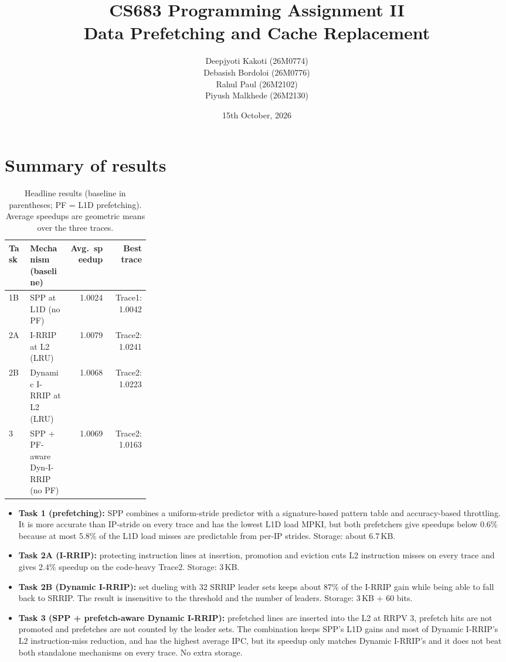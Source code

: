 \documentclass[11pt]{article}
\title{CS683 Programming Assignment II\\Data Prefetching and Cache Replacement}
\date{15th October, 2026}
\author{
      Deepjyoti Kakoti (26M0774)  \\
      Debasish Bordoloi (26M0776) \\
      Rahul Paul (26M2102) \\
      Piyush Malkhede (26M2130)
}
\begin{document}
\sloppy
\maketitle

\section*{Summary of results}
\begin{table}[H]
\centering
\small
\setlength{\tabcolsep}{4pt}
\begin{tabular}{lp{0.28\linewidth}rr}
\toprule
Task & Mechanism (baseline) & Avg.\ speedup & Best trace\\
\midrule
1B & SPP at L1D (no PF) & 1.0024 & Trace1: 1.0042 \\
2A & I-RRIP at L2 (LRU) & 1.0079 & Trace2: 1.0241 \\
2B & Dynamic I-RRIP at L2 (LRU) & 1.0068 & Trace2: 1.0223 \\
3 & SPP + PF-aware Dyn-I-RRIP (no PF) & 1.0069 & Trace2: 1.0163 \\
\bottomrule
\end{tabular}
\caption{Headline results (baseline in parentheses; PF = L1D prefetching).
Average speedups are geometric means over the three traces.}
\label{tab:summary}
\end{table}

\begin{itemize}
  \item \textbf{Task 1 (prefetching):} SPP combines a uniform-stride predictor
        with a signature-based pattern table and accuracy-based throttling. It
        is more accurate than IP-stride on every trace and has the lowest L1D
        load MPKI, but both prefetchers give speedups below 0.6\% because at
        most 5.8\% of the L1D load misses are predictable from per-IP strides.
        Storage: about 6.7\,KB.
  \item \textbf{Task 2A (I-RRIP):} protecting instruction lines at insertion,
        promotion and eviction cuts L2 instruction misses on every trace and
        gives 2.4\% speedup on the code-heavy Trace2. Storage: 3\,KB.
  \item \textbf{Task 2B (Dynamic I-RRIP):} set dueling with 32 SRRIP leader sets
        keeps about 87\% of the I-RRIP gain while being able to fall back to
        SRRIP. The result is insensitive to the threshold and the number of
        leaders. Storage: 3\,KB + 60 bits.
  \item \textbf{Task 3 (SPP + prefetch-aware Dynamic I-RRIP):} prefetched
        lines are inserted into the L2 at RRPV 3, prefetch hits are not
        promoted and prefetches are not counted by the leader sets. The
        combination keeps SPP's L1D gains and most of Dynamic I-RRIP's L2
        instruction-miss reduction, and has the highest average IPC, but its
        speedup only matches Dynamic I-RRIP's and it does not beat both
        standalone mechanisms on every trace. No extra storage.
\end{itemize}
\end{document}
